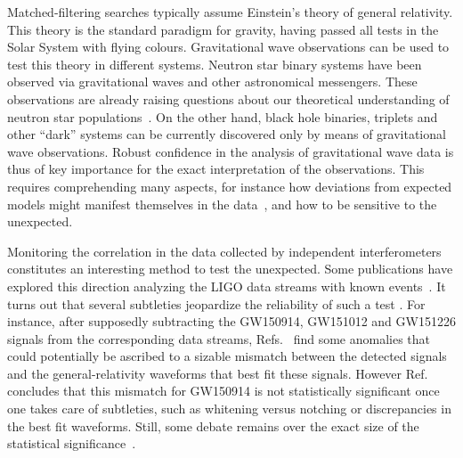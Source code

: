 \documentclass[a4paper,11pt]{article}
\begin{document}
Matched-filtering searches typically assume Einstein's theory of general relativity. This theory is the standard paradigm for gravity, having passed all tests in the Solar System with flying colours. Gravitational wave observations can be used to test this theory in different systems. Neutron star binary systems have been observed via gravitational waves and other astronomical messengers. These observations are already raising questions about our theoretical understanding of neutron star populations~\cite{Monitor:2017mdv, Abbott:2020uma}. On the other hand, black hole binaries, triplets and other ``dark'' systems can be currently discovered only by means of gravitational wave observations. Robust confidence in the analysis of gravitational wave data is thus of key importance for the exact interpretation of the observations. This requires comprehending many aspects, for instance how deviations from expected models might manifest themselves in the data~\cite{Barausse:2014tra}, and how to be sensitive to the unexpected.

Monitoring the correlation in the data collected by independent interferometers constitutes an interesting method to test the unexpected. 
Some publications have explored this direction analyzing the LIGO data streams with known events~\cite{Liu:2016kib, Creswell:2017rbh, Liu:2018dgm, Nielsen:2018bhc, Jackson:2019xbq, Maroju:2019ymy}. 
It turns out that several subtleties jeopardize the reliability of such a test \cite{LIGOScientific:2019hgc}. For instance, after supposedly subtracting the GW150914, GW151012 and GW151226 signals from the corresponding data streams, Refs.~\cite{Liu:2016kib, Creswell:2017rbh, Jackson:2019xbq} find some anomalies that could potentially be ascribed to a sizable mismatch between the detected signals and the general-relativity waveforms that best fit these signals. However Ref.~\cite{Nielsen:2018bhc} concludes that this mismatch for GW150914 is not statistically significant once one takes care of subtleties, such as whitening versus notching or discrepancies in the best fit waveforms. Still, some debate remains over the exact size of the statistical significance~\cite{Jackson:2019xbq, Maroju:2019ymy}.
\end{document}
